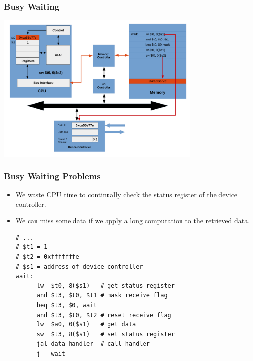 \documentclass{beamer}
\begin{document}
\begin{frame}%
\frametitle{Busy Waiting}

\vspace*{-0.2cm}
\begin{center}
\hspace*{-1cm}\includegraphics[width=10cm]{busy_waiting21.pdf}
\end{center}

\end{frame}


\begin{frame}[fragile]
\frametitle{Busy Waiting Problems}

  \scriptsize

\begin{itemize}

\item We waste CPU time to continually check the status register of the device controller.

\vspace{0.2cm}

\item We can miss some data if we apply a long computation to the retrieved data.

  \vspace{0.2cm}

\begin{lstlisting}
# ...
# $t1 = 1
# $t2 = 0xfffffffe
# $s1 = address of device controller
wait:
      lw  $t0, 8($s1)   # get status register
      and $t3, $t0, $t1 # mask receive flag
      beq $t3, $0, wait
      and $t3, $t0, $t2 # reset receive flag
      lw  $a0, 0($s1)   # get data
      sw  $t3, 8($s1)   # set status register
      jal data_handler  # call handler
      j   wait
\end{lstlisting}

\end{itemize}

\end{frame}
\end{document}
